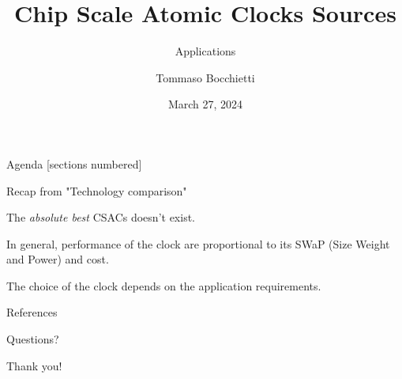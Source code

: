 \documentclass[10pt]{beamer}
\title{Chip Scale Atomic Clocks Sources}
\subtitle{Applications}
\date{March 27, 2024}
\author{Tommaso Bocchietti}
\institute{University of Waterloo}
\begin{document}
\maketitle

\begin{frame}{Agenda}
    [sections numbered]
    \tableofcontents[hideallsubsections]
\end{frame}

\begin{frame}{Recap from "Technology comparison"}

    The \textit{absolute best} CSACs doesn't exist.

    \vspace{10pt}

    In general, performance of the clock are proportional to its SWaP (Size Weight and Power) and cost.

    \vspace{10pt}

    The choice of the clock depends on the application requirements.

\end{frame}






\appendix



\begin{frame}[allowframebreaks]{References}
    \nocite{*}
    
\end{frame}

\begin{frame}[standout]
    Questions?
\end{frame}

\begin{frame}[standout]
    Thank you!
\end{frame}
\end{document}
